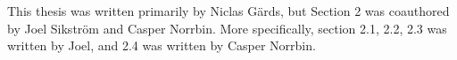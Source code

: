 
This thesis was written primarily by Niclas Gärds, but Section 2 was coauthored by Joel Sikström and Casper Norrbin. More specifically, section 2.1, 2.2, 2.3 was written by Joel, and 2.4 was written by Casper Norrbin.


